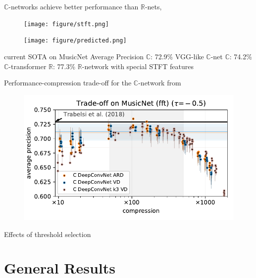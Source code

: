 \documentclass{beamer}
\newcommand{\real}{\mathbb{R}}
\newcommand{\cplx}{\mathbb{C}}
\begin{document}
\begin{frame}[c]{\insertsection}

  $\cplx$-networks achieve better performance than $\real$-nets, \citep{trabelsi_deep_2018}
\begin{figure}[t]
  \centering
  \texttt{[image: figure/stft.png]}
  \par
  \texttt{[image: figure/predicted.png]}
\end{figure}

\medskip
current SOTA on MusicNet Average Precision
$\cplx$: 72.9\% \citet{trabelsi_deep_2018} VGG-like $\cplx$-net
$\cplx$: 74.2\% \citet{yang_complex_2019} $\cplx$-transformer
$\real$: 77.3\% \citet{thickstun_invariances_2018} $\real$-network with special
STFT features \citet{citation_needed}

\end{frame}

\begin{frame}[c]{\insertsection}
Performance-compression trade-off for the $\cplx$-network from \cite{trabelsi_deep_2018}
  \begin{figure}[t]
    \centering
    \includegraphics[scale=0.55]{figure__musicnet__trade-off/paper__musicnetram__fft__-0.5.pdf}
  \end{figure}

\end{frame}

\begin{frame}[c]{\insertsection}
  Effects of threshold selection
\end{frame}


\section{General Results} %
\label{sec:general_results}
\end{document}
